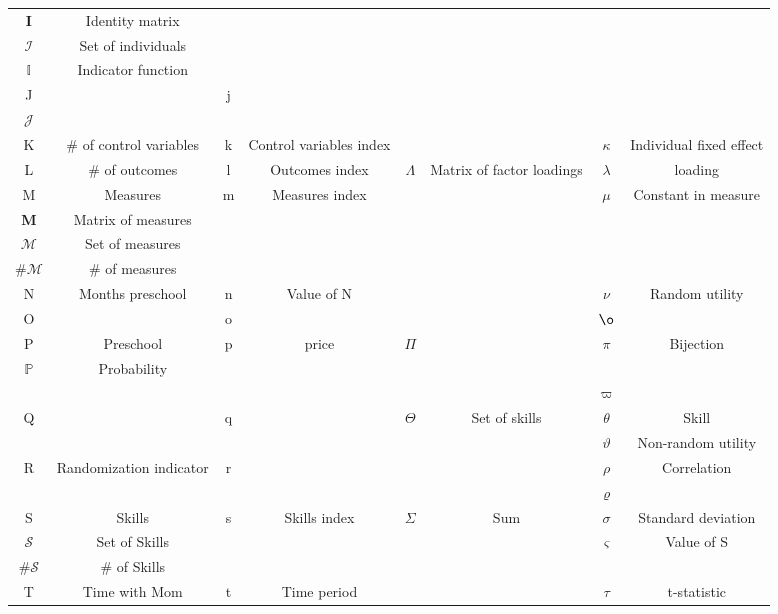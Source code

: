 \begin{center}
\begin{table}
\begin{tabular}{cc cc cc cc}
$\mathbf{I}$	& Identity matrix			& 	& 							&			&					& 	&			\\
$\mathcal{I}$	& Set of individuals			& 	& 						&			&					&		&						\\
$\mathbb{I}$	& Indicator function			& 	& 						&			&					&		&						\\
J			& 						& j	& 						&			&					&		&	\\ 
$\mathcal{J}$	& 						& 	& 			&			&					&		&						\\
K			& \# of control variables		& k	& Control variables index								&			&					& $\kappa$		& Individual fixed effect			\\
L			& \# of outcomes			& l	& Outcomes index								& $\Lambda$	&Matrix of factor loadings & $\lambda$		& loading			\\
M			& Measures					& m	& Measures index				&			&					& $\mu$			& Constant in measure	\\
\textbf{M}		& Matrix of measures			&	&			&					& 		&		\\
$\mathcal{M}$ 	& Set of measures			&	&			&					& 		&		\\
$\#\mathcal{M}$ & \# of measures			&	&			&					& 		&		\\
N			& Months preschool			& n	& Value of N 					&			&					& 		$\nu$		& 	Random utility	\\
O			& 						& o	&								&			&					& $\o$		&						\\
P			& Preschool				& p	& price				& $\Pi$		&					& $\pi$			& Bijection	\\
$\mathbb{P}$	& Probability				& 	&				&		&					&			& 	\\
			&						&	&								&			&					& $\varpi$		&						\\
Q 	 		&	 					& q	&								& $\Theta$	&	Set of skills				& $\theta$		&		Skill			\\
			& 						& 	& 								& 			&					& $\vartheta$	& Non-random utility	\\
R			& Randomization	indicator		& r	&								&			&					& $\rho$		& Correlation			\\
			&						&	&								&			&					& $\varrho$		&						\\
S			&	Skills				& s	& Skills index					& $\Sigma$	& Sum	& $\sigma$		& Standard deviation	\\
$\mathcal{S}$	& Set of Skills				&	&								&			&					& $\varsigma$	& Value of S				\\
$\#\mathcal{S}$	& \# of Skills				&				&								&			&					& 	& 				\\
T			& 	Time with Mom					& t				& Time period 					& 			&					& $\tau$ 		& 	t-statistic				\\

\end{tabular}
\end{table}
\end{center}
